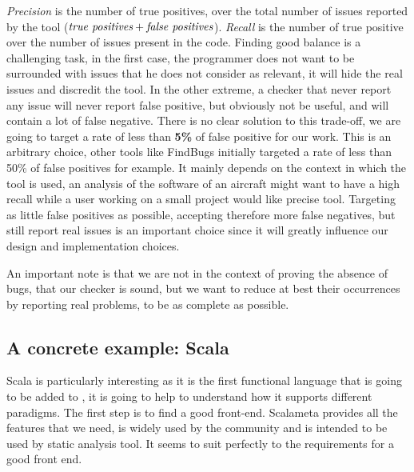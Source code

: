 \emph{Precision} is the number of true positives, over the total number of issues reported by the tool ($ \emph{true positives} + \emph{false positives} $). \emph{Recall} is the number of true positive over the number of issues present in the code. 
Finding good balance is a challenging task, in the first case, the programmer does not want to be surrounded with issues that he does not consider as relevant, it will hide the real issues and discredit the tool. 
In the other extreme, a checker that never report any issue will never report false positive, but obviously not be useful, and will contain a lot of false negative. 
There is no clear solution to this trade-off, we are going to target a rate of less than \textbf{5\%} of false positive for our work.
This is an arbitrary choice, other tools like FindBugs \cite{Hovemeyer:2004:FBE:1052883.1052895} initially targeted a rate of less than 50\% of false positives for example. 
It mainly depends on the context in which the tool is used, an analysis of the software of an aircraft might want to have a high recall while a user working on a small project would like precise tool. 
Targeting as little false positives as possible, accepting therefore more false negatives, but still report real issues is an important choice since it will greatly influence our design and implementation choices.

An important note is that we are not in the context of proving the absence of bugs, that our checker is sound, but we want to reduce at best their occurrences by reporting real problems, to be as complete as possible.

\subsection{A concrete example: Scala}
\label{subsec:concrete_example}

Scala is particularly interesting as it is the first functional language that is going to be added to \slang{}, it is going to help to understand how it supports different paradigms.
The first step is to find a good front-end.
Scalameta \cite{Scalameta:2019:Online} provides all the features that we need, is widely used by the community and is intended to be used by static analysis tool. 
It seems to suit perfectly to the requirements for a good front end.

